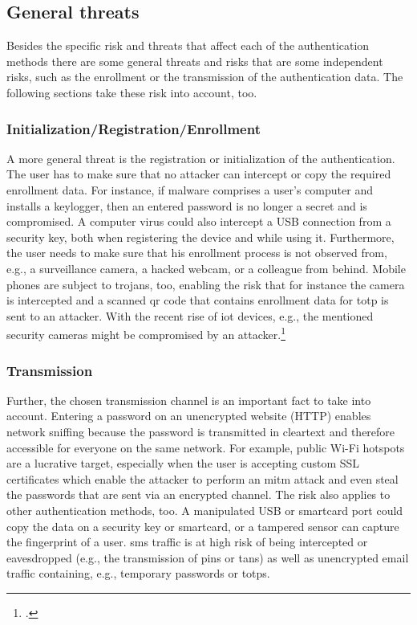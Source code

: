 \subsection{General threats}

Besides the specific risk and threats that affect each of the authentication methods there are some general threats and risks that are some independent risks, such as the enrollment or the transmission of the authentication data. The following sections take these risk into account, too.

\subsubsection{Initialization/Registration/Enrollment}

A more general threat is the registration or initialization of the authentication. The user has to make sure that no attacker can intercept or copy the required enrollment data. For instance, if malware comprises a user’s computer and installs a keylogger, then an entered password is no longer a secret and is compromised. A computer virus could also intercept a USB connection from a security key, both when registering the device and while using it. Furthermore, the user needs to make sure that his enrollment process is not observed from, e.g., a surveillance camera, a hacked webcam, or a colleague from behind. Mobile phones are subject to trojans, too, enabling the risk that for instance the camera is intercepted and a scanned \gls{qr} code that contains enrollment data for \gls{totp} is sent to an attacker. With the recent rise of \gls{iot} devices, e.g., the mentioned security cameras might be compromised by an attacker.\footcites[See][152--153]{10.1007/978-3-642-39235-1_9}[See][61]{Ulqinaku:2019:FPP:3317549.3323404}[See][371--375]{10.1007/978-3-662-45472-5_24}

\subsubsection{Transmission}

Further, the chosen transmission channel is an important fact to take into account. Entering a password on an unencrypted website (HTTP) enables network sniffing because the password is transmitted in cleartext and therefore accessible for everyone on the same network. For example, public Wi-Fi hotspots are a lucrative target, especially when the user is accepting custom SSL certificates which enable the attacker to perform an \gls{mitm} attack and even steal the passwords that are sent via an encrypted channel. The risk also applies to other authentication methods, too. A manipulated USB or smartcard port could copy the data on a security key or smartcard, or a tampered sensor can capture the fingerprint of a user. \gls{sms} traffic is at high risk of being intercepted or eavesdropped (e.g., the transmission of \glspl{pin} or \glspl{tan}) as well as unencrypted email traffic containing, e.g., temporary passwords or \glspl{totp}.
